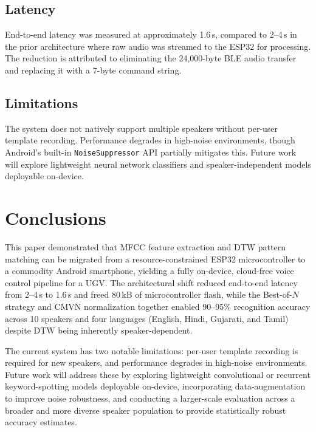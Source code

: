 \documentclass[conference]{IEEEtran}
\begin{document}
\subsection{Latency}
End-to-end latency was measured at approximately 1.6\,s, compared
to 2--4\,s in the prior architecture where raw audio was streamed
to the ESP32 for processing. The reduction is attributed to
eliminating the 24{,}000-byte BLE audio transfer and replacing it
with a 7-byte command string.

\subsection{Limitations}
The system does not natively support multiple speakers without
per-user template recording. Performance degrades in high-noise
environments, though Android's built-in
\texttt{NoiseSuppressor} API partially mitigates this. Future
work will explore lightweight neural network classifiers and
speaker-independent models deployable on-device.

\section{Conclusions} \label{sec:conclusions}
This paper demonstrated that MFCC feature extraction and DTW pattern
matching can be migrated from a resource-constrained ESP32
microcontroller to a commodity Android smartphone, yielding a
fully on-device, cloud-free voice control pipeline for a UGV.
The architectural shift reduced end-to-end latency from 2--4\,s to
1.6\,s and freed 80\,kB of microcontroller flash, while the
Best-of-$N$ strategy and CMVN normalization together enabled
90--95\% recognition accuracy across 10 speakers and four languages
(English, Hindi, Gujarati, and Tamil) despite DTW being inherently
speaker-dependent.

The current system has two notable limitations: per-user template
recording is required for new speakers, and performance degrades in
high-noise environments. Future work will address these by exploring
lightweight convolutional or recurrent keyword-spotting models
deployable on-device, incorporating data-augmentation to improve
noise robustness, and conducting a larger-scale evaluation across a
broader and more diverse speaker population to provide statistically
robust accuracy estimates.

\nocite{*}


\end{document}
